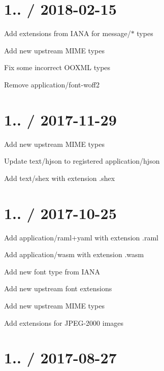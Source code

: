 \section*{1.. / 2018-\/02-\/15 }


\begin{DoxyItemize}
\item Add extensions from I\+A\+NA for {\ttfamily message/$\ast$} types
\item Add new upstream M\+I\+ME types
\item Fix some incorrect O\+O\+X\+ML types
\item Remove {\ttfamily application/font-\/woff2}
\end{DoxyItemize}

\section*{1.. / 2017-\/11-\/29 }


\begin{DoxyItemize}
\item Add new upstream M\+I\+ME types
\item Update {\ttfamily text/hjson} to registered {\ttfamily application/hjson}
\item Add {\ttfamily text/shex} with extension {\ttfamily .shex}
\end{DoxyItemize}

\section*{1.. / 2017-\/10-\/25 }


\begin{DoxyItemize}
\item Add {\ttfamily application/raml+yaml} with extension {\ttfamily .raml}
\item Add {\ttfamily application/wasm} with extension {\ttfamily .wasm}
\item Add new {\ttfamily font} type from I\+A\+NA
\item Add new upstream font extensions
\item Add new upstream M\+I\+ME types
\item Add extensions for J\+P\+E\+G-\/2000 images
\end{DoxyItemize}

\section*{1.. / 2017-\/08-\/27 }


